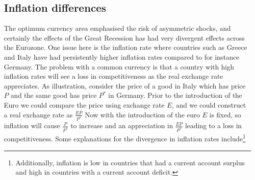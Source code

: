 \documentclass{tufte-handout}
\begin{document}
\subsection{Inflation differences}
The optimum currency area emphasised the risk of asymmetric shocks, and certainly the effects of the Great Recession has had very divergent effects across the Eurozone. 
One issue here is the inflation rate where countries such as Greece and Italy have had persistently higher inflation rates compared to for instance Germany. 
The problem with a common currency is that a country with high inflation rates will see a loss in competitiveness as the real exchange rate appreciates. 
As illustration, consider the price of a good in Italy which has price $P$ and the same good has price $P^*$ in Germany. 
Prior to the introduction of the Euro we could compare the price using exchange rate $E$, and we could construct a real exchange rate as $\frac{EP}{P^*}$
Now with the introduction of the euro $E$ is fixed, so inflation will cause $\frac{P}{P^*}$ to increase and an appreciation in $\frac{EP}{P^*}$ leading to a loss in competitiveness. 
Some explanations for the divergence in inflation rates include\footnote{Additionally, inflation is low in countries that had a current account surplus and high in countries with a current account deficit.}
\end{document}
